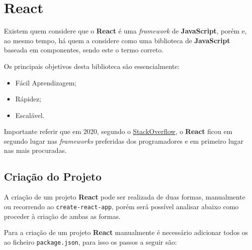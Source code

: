 \section{React}

\begin{minipage}[t]{.3\textwidth}
\end{minipage}
\begin{minipage}[t]{.7\textwidth}
	\minipagerestore
	Existem quem considere que o \textbf{React} é uma \textit{framework} de \textbf{JavaScript}, porém e, ao mesmo tempo, há quem a considere como uma biblioteca de \textbf{JavaScript} baseada em componentes, sendo este o termo correto.

	Os principais objetivos desta biblioteca são essencialmente:

	\begin{itemize}
		\item Fácil Aprendizagem;
		\item Rápidez;
		\item Escalável.
	\end{itemize}
\end{minipage}

\vspace{0.2cm}

Importante referir que em 2020, segundo o \href{https://insights.stackoverflow.com/survey/2020#technology-most-loved-dreaded-and-wanted-web-frameworks-loved2}{StackOverflow}, o \textbf{React} ficou em segundo lugar nas \textit{frameworks} preferidas dos programadores e em primeiro lugar nas mais procuradas.

\subsection{Criação do Projeto}

A criação de um projeto \textbf{React} pode ser realizada de duas formas, manualmente ou recorrendo ao \texttt{create-react-app}, porém será possível analisar abaixo como proceder à criação de ambas as formas.

Para a criação de um projeto \textbf{React} manualmente é necessário adicionar todos os \textit{} ao ficheiro \texttt{package.json}, para isso os passos a seguir são:

